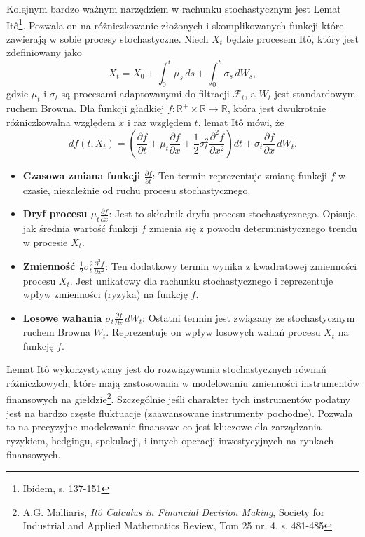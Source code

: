 Kolejnym bardzo ważnym narzędziem w rachunku stochastycznym jest Lemat Itô\footnote{Ibidem, s. 137-151}. Pozwala on na różniczkowanie złożonych i skomplikowanych funkcji które zawierają w sobie procesy stochastyczne. 
Niech \( X_t \) będzie procesem Itô, który jest zdefiniowany jako
\begin{equation}
X_t = X_0 + \int_0^t \mu_s \, ds + \int_0^t \sigma_s \, dW_s,
\end{equation}
gdzie \( \mu_t \) i \( \sigma_t \) są procesami adaptowanymi do filtracji \( \mathcal{F}_t \), a \( W_t \) jest standardowym ruchem Browna. Dla funkcji gładkiej \( f: \mathbb{R}^+ \times \mathbb{R} \to \mathbb{R} \), która jest dwukrotnie różniczkowalna względem \( x \) i raz względem \( t \), lemat Itô mówi, że
\begin{equation}
df(t, X_t) = \left( \frac{\partial f}{\partial t} + \mu_t \frac{\partial f}{\partial x} + \frac{1}{2} \sigma_t^2 \frac{\partial^2 f}{\partial x^2} \right) dt + \sigma_t \frac{\partial f}{\partial x} \, dW_t.
\end{equation}


\begin{itemize}
    \item \textbf{Czasowa zmiana funkcji \(\frac{\partial f}{\partial t}\)}: Ten termin reprezentuje zmianę funkcji \( f \) w czasie, niezależnie od ruchu procesu stochastycznego.

    \item \textbf{Dryf procesu \(\mu_t \frac{\partial f}{\partial x}\)}: Jest to składnik dryfu procesu stochastycznego. Opisuje, jak średnia wartość funkcji \( f \) zmienia się z powodu deterministycznego trendu w procesie \( X_t \).

    \item \textbf{Zmienność \(\frac{1}{2} \sigma_t^2 \frac{\partial^2 f}{\partial x^2}\)}: Ten dodatkowy termin wynika z kwadratowej zmienności procesu \( X_t \). Jest unikatowy dla rachunku stochastycznego i reprezentuje wpływ zmienności (ryzyka) na funkcję \( f \).

    \item \textbf{Losowe wahania \(\sigma_t \frac{\partial f}{\partial x} \, dW_t\)}: Ostatni termin jest związany ze stochastycznym ruchem Browna \( W_t \). Reprezentuje on wpływ losowych wahań procesu \( X_t \) na funkcję \( f \).
\end{itemize}

Lemat Itô wykorzystywany jest do rozwiązywania stochastycznych równań różniczkowych, które mają zastosowania w modelowaniu zmienności instrumentów finansowych na giełdzie\footnote{A.G. Malliaris, \textit{Itô Calculus in Financial Decision Making}, Society for Industrial and Applied Mathematics Review, Tom 25 nr. 4, s. 481-485}. Szczególnie jeśli charakter tych instrumentów podatny jest na bardzo częste fluktuacje (zaawansowane instrumenty pochodne). Pozwala to na precyzyjne modelowanie finansowe co jest kluczowe dla zarządzania ryzykiem, hedgingu, spekulacji, i innych operacji inwestycyjnych na rynkach finansowych.


